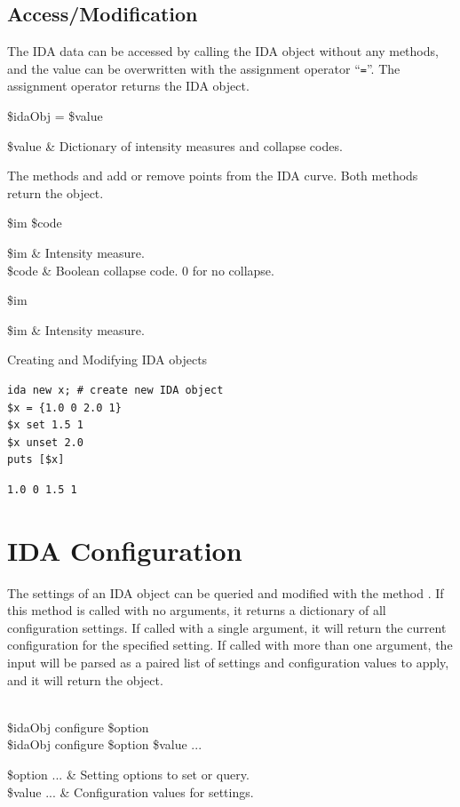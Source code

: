 \documentclass{article}
\renewcommand{\^}[1]{\textsuperscript{#1}}
\renewcommand{\_}[1]{\textsubscript{#1}}
\begin{document}
\subsection{Access/Modification}
The IDA data can be accessed by calling the IDA object without any methods, and the value can be overwritten with the assignment operator ``\texttt{=}''. 
The assignment operator returns the IDA object.
\begin{syntax}
 \$idaObj = \$value
\end{syntax}
\begin{args}
\$value & Dictionary of intensity measures and collapse codes.
\end{args}

The methods  and  add or remove points from the IDA curve.
Both methods return the object.

\begin{syntax}
 \$im \$code
\end{syntax}
\begin{args}
\$im & Intensity measure. \\
\$code & Boolean collapse code. 0 for no collapse. 
\end{args}

\begin{syntax}
 \$im
\end{syntax}
\begin{args}
\$im & Intensity measure. 
\end{args}

\begin{example}{Creating and Modifying IDA objects}
\begin{lstlisting}
ida new x; # create new IDA object
$x = {1.0 0 2.0 1}
$x set 1.5 1
$x unset 2.0
puts [$x]
\end{lstlisting}
\tcblower
\begin{lstlisting}
1.0 0 1.5 1
\end{lstlisting}
\end{example}
\clearpage

\section{IDA Configuration}
The settings of an IDA object can be queried and modified with the method .
If this method is called with no arguments, it returns a dictionary of all configuration settings. 
If called with a single argument, it will return the current configuration for the specified setting. 
If called with more than one argument, the input will be parsed as a paired list of settings and configuration values to apply, and it will return the object.
\begin{syntax}
 \\
\$idaObj configure \$option \\
\$idaObj configure \$option \$value ...
\end{syntax}
\begin{args}
\$option ... & Setting options to set or query. \\
\$value ... & Configuration values for settings.
\end{args}
\FloatBarrier
\end{document}

